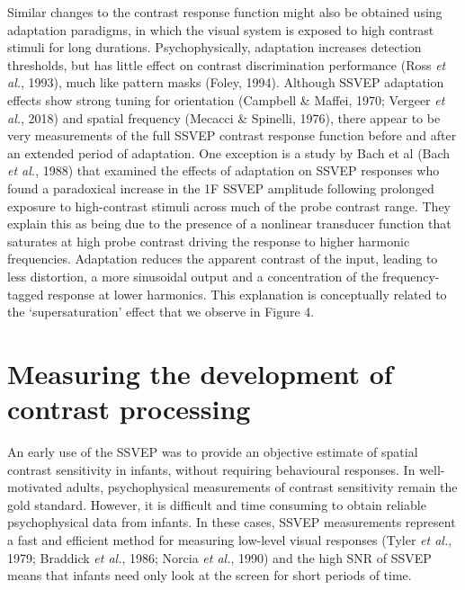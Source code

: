 \documentclass[
  letterpaper,
  DIV=11,
  numbers=noendperiod]{scrartcl}
\begin{document}
Similar changes to the contrast response function might also be obtained
using adaptation paradigms, in which the visual system is exposed to
high contrast stimuli for long durations. Psychophysically, adaptation
increases detection thresholds, but has little effect on contrast
discrimination performance (Ross \emph{et al.}, 1993), much like pattern
masks (Foley, 1994). Although SSVEP adaptation effects show strong
tuning for orientation (Campbell \& Maffei, 1970; Vergeer \emph{et al.},
2018) and spatial frequency (Mecacci \& Spinelli, 1976), there appear to
be very measurements of the full SSVEP contrast response function before
and after an extended period of adaptation. One exception is a study by
Bach et al (Bach \emph{et al.}, 1988) that examined the effects of
adaptation on SSVEP responses who found a paradoxical increase in the 1F
SSVEP amplitude following prolonged exposure to high-contrast stimuli
across much of the probe contrast range. They explain this as being due
to the presence of a nonlinear transducer function that saturates at
high probe contrast driving the response to higher harmonic frequencies.
Adaptation reduces the apparent contrast of the input, leading to less
distortion, a more sinusoidal output and a concentration of the
frequency-tagged response at lower harmonics. This explanation is
conceptually related to the `supersaturation' effect that we observe in
Figure 4.

\section{Measuring the development of contrast
processing}\label{measuring-the-development-of-contrast-processing}

An early use of the SSVEP was to provide an objective estimate of
spatial contrast sensitivity in infants, without requiring behavioural
responses. In well-motivated adults, psychophysical measurements of
contrast sensitivity remain the gold standard. However, it is difficult
and time consuming to obtain reliable psychophysical data from infants.
In these cases, SSVEP measurements represent a fast and efficient method
for measuring low-level visual responses (Tyler \emph{et al.}, 1979;
Braddick \emph{et al.}, 1986; Norcia \emph{et al.}, 1990) and the high
SNR of SSVEP means that infants need only look at the screen for short
periods of time.
\end{document}

